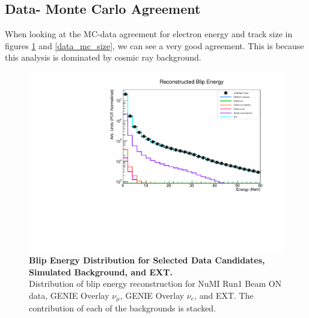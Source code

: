 \newpage
\subsection{Data- Monte Carlo Agreement}
When looking at the MC-data agreement for electron energy and track size in figures \ref{data_mc_energy} and \ref{data_mc_size}, we can see a very good agreement. This is because this analysis is dominated by cosmic ray background.


\begin{figure}[h!]
    \centering
    \includegraphics[width=120mm]{Figures/energy.pdf}
    \caption[Blip Energy Distribution for Selected Data Candidates, Simulated Background, and EXT.]{{\textbf{Blip Energy Distribution for Selected Data Candidates, Simulated Background, and EXT.}}\\ Distribution of blip energy reconstruction for NuMI Run1 Beam ON data, GENIE Overlay $\nu_{\mu}$, GENIE Overlay $\nu_{e}$, and EXT. The contribution of each of the backgrounds is stacked.}
    \label{data_mc_energy}
\end{figure}

